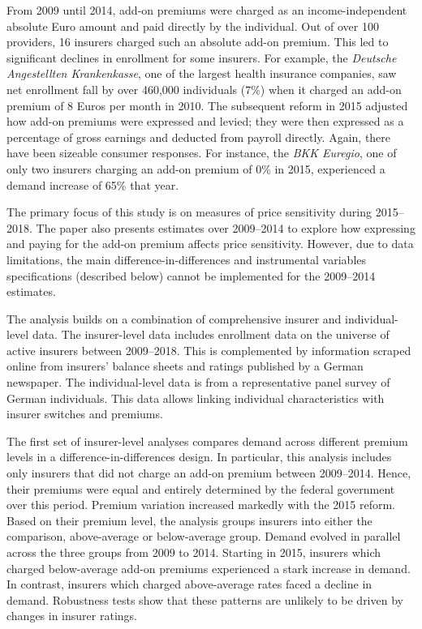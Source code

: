 \documentclass[a4paper, 11pt, english]{article}
\begin{document}
From 2009 until 2014, add-on premiums were charged as an income-independent absolute Euro amount and paid directly by the individual. Out of over 100 providers, 16 insurers charged such an absolute add-on premium. This led to significant declines in enrollment for some insurers. For example, the \textit{Deutsche Angestellten Krankenkasse}, one of the largest health insurance companies, saw net enrollment fall by over 460,000 individuals (7\%) when it charged an add-on premium of 8 Euros per month in 2010. The subsequent reform in 2015 adjusted how add-on premiums were expressed and levied; they were then expressed as a percentage of gross earnings and deducted from payroll directly. Again, there have been sizeable consumer responses. For instance, the \textit{BKK Euregio}, one of only two insurers charging an add-on premium of 0\% in 2015, experienced a demand increase of 65\% that year. 
 
The primary focus of this study is on measures of price sensitivity during 2015--2018. The paper also presents estimates over 2009--2014 to explore how expressing and paying for the add-on premium affects price sensitivity. However, due to data limitations, the main difference-in-differences and instrumental variables specifications (described below) cannot be implemented for the 2009--2014 estimates.

The analysis builds on a combination of comprehensive insurer and individual-level data. The insurer-level data includes enrollment data on the universe of active insurers between 2009--2018. This is complemented by information scraped online from insurers' balance sheets and ratings published by a German newspaper. The individual-level data is from a representative panel survey of German individuals. This data allows linking individual characteristics with insurer switches and premiums.

The first set of insurer-level analyses compares demand across different premium levels in a difference-in-differences design. In particular, this analysis includes only insurers that did not charge an add-on premium between 2009--2014. Hence, their premiums were equal and entirely determined by the federal government over this period. Premium variation increased markedly with the 2015 reform. Based on their premium level, the analysis groups insurers into either the comparison, above-average or below-average group. Demand evolved in parallel across the three groups from 2009 to 2014. Starting in 2015, insurers which charged below-average add-on premiums experienced a stark increase in demand. In contrast, insurers which charged above-average rates faced a decline in demand. Robustness tests show that these patterns are unlikely to be driven by changes in insurer ratings.
\end{document}

